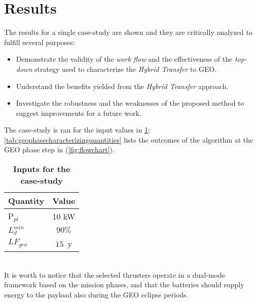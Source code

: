 
\section{Results}
\label{sec:results}
The results for a single case-study are shown and they are critically analyzed to fulfill several purposes:
\begin{itemize}
\item Demonstrate the validity of the \emph{work flow} and the effectiveness of the \emph{top-down} strategy used to characterize the \emph{Hybrid Transfer} to GEO.
\item Understand the benefits yielded from the \emph{Hybrid Transfer} approach.
\item Investigate the robustness and the weaknesses of the proposed method to suggest improvements for a future work.
\end{itemize}
The case-study is ran for the input values in \tablename\ref{tab:inputscasestudy}; \tablename\ref{tab:geophasecharacterizingquantities} lists the outcomes of the algorithm at the GEO phase step in (\figurename\ref{fig:flowchart}). 
\begin{table}[htp]
\centering
\caption{\textbf{Inputs for the case-study}}
\begin{tabular}{lc}
\toprule
\toprule
Quantity&Value\\
\midrule
P$_{pl}$&10 \si{\kilo\W}\\
$L_d^{min}$&$90\%$\\
$LF_{geo}$&$15$~y\\
\bottomrule
\bottomrule
\end{tabular}
\label{tab:inputscasestudy}
\end{table}
%
\\
It is worth to notice that the selected thrusters operate in a dual-mode framework based on the mission phases, and that the batteries should supply energy to the payload also during the GEO eclipse periods.
%
